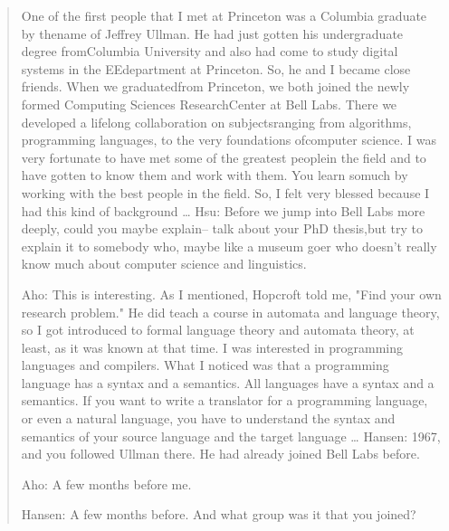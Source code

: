 \begin{quotation}
    One of the first people that I met at Princeton was a Columbia graduate by thename of Jeffrey 
Ullman. He had just gotten his undergraduate degree fromColumbia University and also had come to 
study digital systems in the EEdepartment at Princeton. So, he and I became close friends. When we 
graduatedfrom Princeton, we both joined the newly formed Computing Sciences ResearchCenter at Bell 
Labs. There we developed a lifelong collaboration on subjectsranging from algorithms, programming 
languages, to the very foundations ofcomputer science. I was very fortunate to have met some of the 
greatest peoplein the field and to have gotten to know them and work with them. You learn somuch by 
working with the best people in the field. So, I felt very blessed because I had this kind of 
background
\dots
Hsu: Before we jump into Bell Labs more deeply, could you maybe explain-- talk about your PhD 
thesis,but try to explain it to somebody who, maybe like a museum goer who doesn't really know much 
about computer science and linguistics.

Aho: This is interesting. As I mentioned, Hopcroft told me, "Find your own research problem." He 
did teach a course in automata and language theory, so I got introduced to formal language theory 
and automata theory, at least, as it was known at that time. I was interested in programming 
languages and compilers. What I noticed was that a programming language has a syntax and a 
semantics. All languages have a syntax and a semantics. If you want to write a translator for a 
programming language, or even a natural language, you have to understand the syntax and semantics of 
your source language and the target language
\dots
Hansen: 1967, and you followed Ullman there. He had already joined Bell Labs before.

Aho: A few months before me.

Hansen: A few months before. And what group was it that you joined?


\end{quotation}
